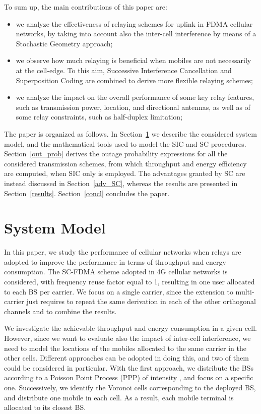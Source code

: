 \documentclass[12pt, letterpaper, onecolumn, draftcls]{IEEEtran}
\begin{document}
To sum up, the main contributions of this paper are:
\begin{itemize}
 \item we analyze the effectiveness of relaying schemes for uplink in FDMA cellular networks, by taking into account also the inter-cell interference by means of a Stochastic Geometry approach;
 \item we observe how much relaying is beneficial when mobiles are not necessarily at the cell-edge. To this aim, Successive Interference Cancellation and Superposition Coding are combined to derive more flexible relaying schemes;
 \item we analyze the impact on the overall performance of some key relay features, such as transmission power, location, and directional antennas, as well as of some relay constraints, such as half-duplex limitation;
\end{itemize}



The paper is organized as follows. In Section~\ref{sys_mod} we describe the considered system model, and the mathematical tools used to model the SIC and SC procedures. Section~\ref{out_prob} derives the outage probability expressions for all the considered transmission schemes, from which throughput and energy efficiency are computed, when SIC only is employed. The advantages granted by SC are instead discussed in Section~\ref{adv_SC}, whereas the results are presented in Section~\ref{results}. Section~\ref{concl} concludes the paper.

\section{System Model}
\label{sys_mod}
In this paper, we study the performance of cellular networks when relays are adopted to improve the performance in terms of throughput and energy consumption.
The SC-FDMA scheme adopted in 4G cellular networks is considered, with frequency reuse factor equal to 1, resulting in one user allocated to each BS per carrier.
We focus on a single carrier, since the extension to multi-carrier just requires to repeat the same derivation in each of the other orthogonal channels and to combine the results.

We investigate the achievable throughput and energy consumption in a given cell. However, since we want to evaluate also the impact of inter-cell interference, we need to model the locations of the mobiles allocated to the same carrier in the other cells.
Different approaches can be adopted in doing this, and two of them could be considered in particular.
With the first approach, we distribute the BSs according to a Poisson Point Process (PPP)  of intensity , and focus on a specific one. Successively, we identify the Voronoi cells corresponding to the deployed BS, and distribute one mobile in each cell. As a result, each mobile terminal is allocated to its closest BS.
\end{document}

